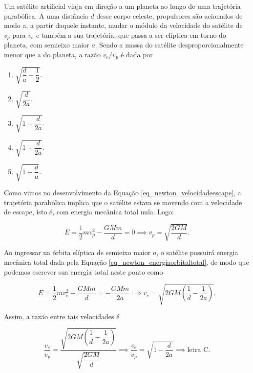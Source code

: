 \begin{exemplo}\label{exemplo_gravitacao_velocidadedeescapeex04}

Um satélite artificial viaja em direção a um planeta ao longo de uma trajetória parabólica. A uma distância $d$ desse corpo celeste, propulsores são acionados de modo a, a partir daquele instante, mudar o módulo da velocidade do satélite de $v_p$ para $v_e$ e também a sua trajetória, que passa a ser elíptica em torno do planeta, com semieixo maior $a$. Sendo a massa do satélite desproporcionalmente menor que a do planeta, a razão $v_e/v_p$ é dada por

\vspace{0.2cm}

\begin{enumerate}
    \item[A)] $\sqrt{\dfrac{d}{a}-\dfrac{1}{2}}$.
    
    \item[B)] $\sqrt{\dfrac{d}{2a}}$.
    
    \item[C)] $\sqrt{1-\dfrac{d}{2a}}$.
    
    \item[D)] $\sqrt{1+\dfrac{d}{2a}}$.
    
    \item[E)] $\sqrt{1-\dfrac{d}{a}}$.
    
\end{enumerate}

\resolucao

Como vimos no desenvolvimento da Equação \eqref{eq_newton_velocidadeescape}, a trajetória parabólica implica que o satélite estava se movendo com a velocidade de escape, isto é, com energia mecânica total nula. Logo:

$$ E = \dfrac{1}{2}mv_p^2 - \dfrac{GMm}{d} = 0 \implies v_p = \sqrt{\dfrac{2GM}{d}}.$$

Ao ingressar na órbita elíptica de semieixo maior $a$, o satélite possuirá energia mecânica total dada pela Equação \eqref{eq_newton_energiaorbitaltotal}, de modo que podemos escrever sua energia total neste ponto como

$$ E = \dfrac{1}{2}mv_e^2 - \dfrac{GMm}{d} = - \dfrac{GMm}{2a} \implies v_e = \sqrt {2GM \left(\dfrac{1}{d} - \dfrac{1}{2a} \right)}.$$

Assim, a razão entre tais velocidades é

$$ \dfrac{v_e}{v_p} = \dfrac{\sqrt {2GM \left(\dfrac{1}{d} - \dfrac{1}{2a} \right)}}{\sqrt{\dfrac{2GM}{d}}} \implies \boxed{\dfrac{v_e}{v_p} = \sqrt{1 - \dfrac{d}{2a}} \implies \text{letra C.}}$$

\end{exemplo}

